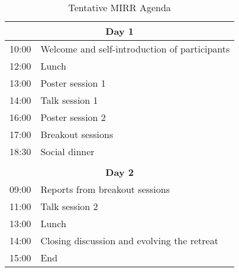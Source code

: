 \begin{table}[]
\centering
\caption{Tentative MIRR Agenda}
\label{tbl:agenda}
\begin{tabular}{ l l }
\multicolumn{2}{c}{\textbf{Day 1}} \\ \hline
10:00 &
Welcome and self-introduction of participants \\
12:00 &
Lunch\\
13:00 &
Poster session 1\\
14:00 &
Talk session 1\\
16:00 &
Poster session 2\\
17:00 &
Breakout sessions\\
18:30 &
Social dinner\\
\\
\multicolumn{2}{c}{\textbf{Day 2}} \\ \hline
09:00 &
Reports from breakout sessions\\
11:00 &
Talk session 2\\
13:00 &
Lunch\\
14:00 &
Closing discussion and evolving the retreat\\
15:00 &
End\\

\end{tabular}
\end{table}
